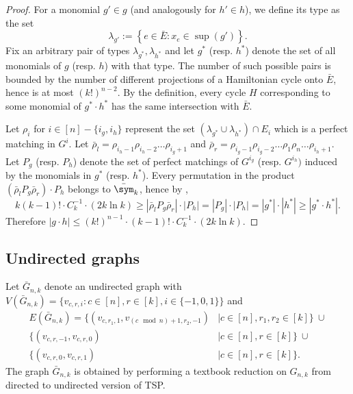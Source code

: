\begin{proof}
    For a monomial $g' \in g$ (and analogously for $h' \in h$), we define its type as the set
    $$
    \lambda_{g'} := \left\{
        e \in \bar{E} \colon
        x_e \in \sup(g')
    \right\}.
    $$
    Fix an arbitrary pair of types $\lambda_{g^*}, \lambda_{h^*}$ and let $g^*$ (resp. $h^*$) denote the set of all monomials of $g$ (resp. $h$) with that type. The number of such possible pairs is bounded by the number of different projections of a Hamiltonian cycle onto $\bar{E}$, hence is at most $(k!)^{n - 2}$. By the definition, every cycle $H$ corresponding to some monomial of $g^* \cdot h^*$ has the same intersection with $\bar{E}$.

    Let $\rho_i$ for $i \in [n] - \{i_g, i_h\}$ represent the set $(\lambda_{g^*} \cup \lambda_{h^*}) \cap E_i$ which is a perfect matching in $G^i$. Let $\bar\rho_l = \rho_{i_h - 1}\rho_{i_h - 2}\dots\rho_{i_g + 1}$ and $\bar\rho_r = \rho_{i_g-1}\rho_{i_g-2}\dots\rho_1\rho_n\dots\rho_{i_h+1}$.
    Let $P_g$ (resp. $P_h$) denote the set of perfect matchings of $G^{i_g}$ (resp. $G^{i_h})$ induced by the monomials in $g^*$ (resp. $h^*$). Every permutation in the product
    $(\bar\rho_l P_g \bar\rho_r) \cdot P_h$ belongs to $\bar\sym_k$, hence by ,
    $$
    k(k - 1)! \cdot C_k^{-1} \cdot (2k \ln k) \geq
    |\bar\rho_l P_g \bar\rho_r| \cdot |P_h| =
    |P_g| \cdot |P_h| = |g^*| \cdot |h^*| \geq |g^* \cdot h^*|.
    $$
    Therefore $|g \cdot h| \leq (k!)^{n - 1} \cdot (k - 1)! \cdot C_k^{-1} \cdot (2k \ln k)$.
    
\end{proof}


\subsection{Undirected graphs}

Let $\bar{G}_{n, k}$ denote an undirected graph with
$
V(\bar{G}_{n, k}) = \{ v_{c,r,i} \colon c \in [n], r \in [k], i \in \{-1, 0, 1\} \}
$ and
\begin{align*}
E(\bar{G}_{n, k}) = \{
    (v_{c, r_1, 1}, v_{(c \mod n) + 1, r_2, -1}) &\mid c \in [n], r_1, r_2 \in [k]
\} \ \cup \\
 \{ (v_{c, r, -1}, v_{c, r, 0}) &\mid c \in [n], r \in [k] \} \ \cup \\
 \{ (v_{c, r, 0}, v_{c, r, 1}) &\mid c \in [n], r \in [k] \}.
\end{align*}
The graph $\bar{G}_{n, k}$ is obtained by performing a textbook reduction on $G_{n, k}$ from directed to undirected version of TSP.

